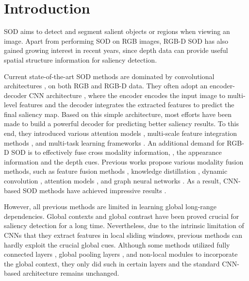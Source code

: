\documentclass[10pt,twocolumn,letterpaper]{article}
\begin{document}
\section{Introduction}
SOD aims to detect and segment salient objects or regions when viewing an image.
Apart from performing SOD on RGB images, RGB-D SOD has also gained growing interest in recent years, since depth data can provide useful spatial structure information for saliency detection.



Current state-of-the-art SOD methods are dominated by convolutional architectures \cite{lecun1998gradient}, on both RGB and RGB-D data. They often adopt an encoder-decoder CNN architecture \cite{noh2015learning,ronneberger2015unet}, where the encoder encodes the input image to multi-level features
and the decoder integrates the extracted features to predict the final saliency map. Based on this simple architecture, most efforts have been made to build a powerful decoder for predicting better saliency results. To this end, they introduced various attention models \cite{liu2018picanet,zhang2018pagr,chen2020dpanet}, multi-scale feature integration methods \cite{hou2018dss,MINet-CVPR2020,fan2020bbsnet,luo2020Cas-Gnn}, and multi-task learning frameworks \cite{wang2018salient,zhang2019capsal,zhao2019EGNet,CVPR2020_LDF,Wei2020CoNet}. An additional demand for RGB-D SOD is to effectively fuse cross modality information, \ie, the appearance information and the depth cues. Previous works propose various modality fusion methods, such as feature fusion methods \cite{han2017cnns,chen2018progressively,fan2020bbsnet,Fu2020JLDCF}, knowledge distillation \cite{piao2020a2dele}, dynamic convolution \cite{HDFNet-ECCV2020}, attention models \cite{Li2020CMWNet,zhang2020ATSA}, and graph neural networks \cite{luo2020Cas-Gnn}.
As a result, CNN-based SOD methods have achieved impressive results \cite{wang2019salient1,zhou2021rgb}.



However, all previous methods are limited in learning global long-range dependencies. Global contexts \cite{goferman2011context,zhao2015saliency,ren2015exploiting,luo2017non,liu2018picanet} and global contrast \cite{zhai2006visual,borji2012exploiting,cheng2014global} have been proved crucial for saliency detection for a long time. Nevertheless, due to the intrinsic limitation of CNNs that they extract features in local sliding windows, previous methods can hardly exploit the crucial global cues.
Although some methods utilized fully connected layers \cite{liu2016dhsnet,han2017cnns}, global pooling layers \cite{luo2017non,liu2018picanet,wang2017stagewise}, and non-local modules \cite{liu2020S2MA,chen2020dpanet} to incorporate the global context, they only did such in certain layers and the standard CNN-based architecture remains unchanged.
\end{document}
